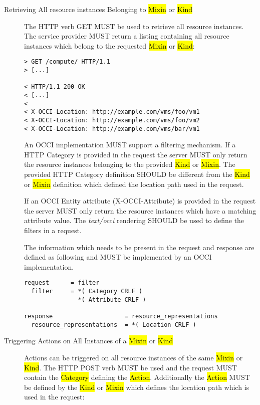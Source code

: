 \documentclass[10pt,a4paper]{article}
\begin{document}
\begin{description}
  \item[Retrieving All resource instances Belonging to \hl{Mixin} or
    \hl{Kind}] The HTTP verb GET MUST be used to retrieve all resource
    instances. The service provider MUST return a listing containing
    all resource instances which belong to the requested \hl{Mixin} or
    \hl{Kind}:

\begin{verbatim}
> GET /compute/ HTTP/1.1
> [...]
 
< HTTP/1.1 200 OK
< [...]
< 
< X-OCCI-Location: http://example.com/vms/foo/vm1
< X-OCCI-Location: http://example.com/vms/foo/vm2
< X-OCCI-Location: http://example.com/vms/bar/vm1
\end{verbatim}

    An OCCI implementation MUST support a filtering mechanism. If a
    HTTP Category is provided in the request the server MUST only
    return the resource instances belonging to the provided \hl{Kind}
    or \hl{Mixin}. The provided HTTP Category definition SHOULD be
    different from the \hl{Kind} or \hl{Mixin} definition which
    defined the location path used in the request.

    If an OCCI Entity attribute (X-OCCI-Attribute) is provided in the
    request the server MUST only return the resource instances which
    have a matching attribute value. The \emph{text/occi} rendering
    SHOULD be used to define the filters in a request.

    The information which needs to be present in the request and
    response are defined as following and MUST be implemented by an
    OCCI implementation.

\begin{verbatim}
request      = filter
  filter     = *( Category CRLF )
               *( Attribute CRLF )

response                    = resource_representations
  resource_representations  = *( Location CRLF ) 
\end{verbatim}

  \item[Triggering Actions on All Instances of a \hl{Mixin} or
    \hl{Kind}] Actions can be triggered on all resource instances of
    the same \hl{Mixin} or \hl{Kind}. The HTTP POST verb MUST be used
    and the request MUST contain the \hl{Category} defining the
    \hl{Action}.  Additionally the \hl{Action} MUST be defined by the
    \hl{Kind} or \hl{Mixin} which defines the location path which is
    used in the request:


\end{description}
\end{document}

